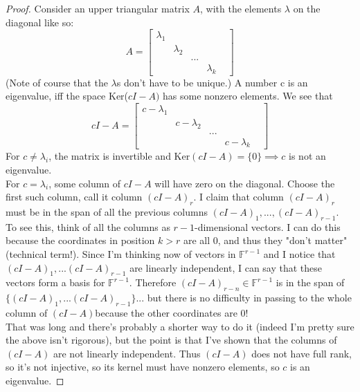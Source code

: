 \documentclass[12pt]{article}
\newenvironment{problem}[2][Problem]{\begin{trivlist}
\item[\hskip \labelsep {\bfseries #1}\hskip \labelsep {\bfseries #2.}]}{\end{trivlist}}
\theoremstyle{definition}
\theoremstyle{definition}
\theoremstyle{definition}
\theoremstyle{definition}
\begin{document}
\begin{problem}{4.6}
\begin{proof}
Consider an upper triangular matrix $A$, with the elements $\lambda$ on the diagonal like so:
$$
A = \begin{bmatrix}
\lambda_1 & & \\
& \lambda_2 & \\
& & ... & & \\
& & & \lambda_k
\end{bmatrix}
$$
(Note of course that the $\lambda$s don't have to be unique.) A number c is an eigenvalue, iff the space Ker($cI - A)$ has some nonzero elements. We see that 
$$
cI - A = \begin{bmatrix}
c - \lambda_1 & & \\
& c - \lambda_2 & \\
& & ... & & \\
& & & c - \lambda_k
\end{bmatrix}
$$
For $c \neq \lambda_i$, the matrix is invertible and Ker$(cI - A) = \{0\} \implies c$ is not an eigenvalue. \\
For $c = \lambda_i$, some column of $cI -A$ will have zero on the diagonal. Choose the first such column, call it column $(cI-A)_r$. I claim that column $(cI-A)_r$ must be in the span of all the previous columns $(cI-A)_1,...,(cI-A)_{r-1}$.  \\
To see this, think of all the columns as $r-1$-dimensional vectors. I can do this because the coordinates in position $k>r$ are all 0, and thus they "don't matter" (technical term!). Since I'm thinking now of vectors in $\mathbb{F}^{r-1}$ and I notice that $(cI-A)_1, ... (cI-A)_{r-1}$ are linearly independent, I can say that these vectors form a basis for  $\mathbb{F}^{r-1}$. Therefore $(cI-A)_{r-n} \in \mathbb{F}^{r-1}$ is in the span of $ \{ (cI-A)_1, ... (cI-A)_{r-1} \}$... but there is no difficulty in passing to the whole column of $(cI-A)$because the other coordinates are 0! \\
That was long and there's probably a shorter way to do it (indeed I'm pretty sure the above isn't rigorous), but the point is that I've shown that the columns of $(cI-A)$ are not linearly independent. Thus $(cI-A)$ does not have full rank, so it's not injective, so its kernel must have nonzero elements, so $c$ is an eigenvalue.
\end{proof}
\end{problem}
\end{document}
